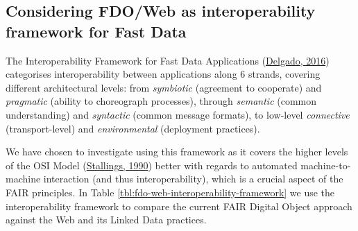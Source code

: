 \hypertarget{sec:interoperability-compare}{%
\subsection{Considering FDO/Web as interoperability framework for Fast Data}\label{sec:interoperability-compare}}

The Interoperability Framework for Fast Data Applications (\protect\hyperlink{ref-KlCFFFyL}{Delgado, 2016}) categorises interoperability between applications along 6 strands, covering different architectural levels: from \emph{symbiotic} (agreement to cooperate) and \emph{pragmatic} (ability to choreograph processes), through \emph{semantic} (common understanding) and \emph{syntactic} (common message formats), to low-level \emph{connective} (transport-level) and \emph{environmental} (deployment practices).

We have chosen to investigate using this framework as it covers the higher levels of the OSI Model (\protect\hyperlink{ref-8ZRGFa6y}{Stallings, 1990}) better with regards to automated machine-to-machine interaction (and thus interoperability), which is a crucial aspect of the FAIR principles. In Table \ref{tbl:fdo-web-interoperability-framework} we use the interoperability framework to compare the current FAIR Digital Object approach against the Web and its Linked Data practices.

